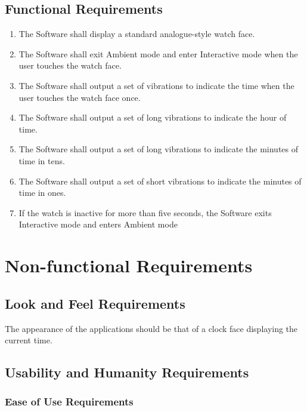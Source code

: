 \documentclass[12pt, titlepage]{article}
\begin{document}
\subsection{Functional Requirements}
\begin{enumerate}

\item The Software shall display a standard analogue-style watch face.

\item The Software shall exit Ambient mode and enter Interactive mode when the user touches the watch face.

\item The Software shall output a set of vibrations to indicate the time when the user touches the watch face once. 

\item The Software shall output a set of long vibrations to indicate the hour of time.

\item The Software shall output a set of long vibrations to indicate the minutes of time in tens.

\item The Software shall output a set of short vibrations to indicate the minutes of time in ones. 

\item If the watch is inactive for more than five seconds, the Software exits Interactive mode and enters Ambient mode

\end{enumerate}

\section{Non-functional Requirements}

\subsection{Look and Feel Requirements}

The appearance of the applications should be that of a clock face displaying the current time.

\subsection{Usability and Humanity Requirements}

\subsubsection{Ease of Use Requirements}
\end{document}
